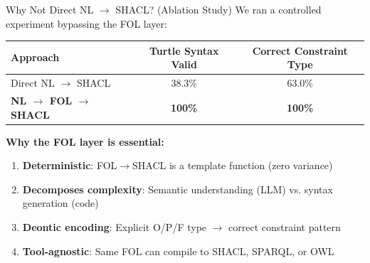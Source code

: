 \documentclass[aspectratio=169, 10pt]{beamer}
\begin{document}
\begin{frame}{Why Not Direct NL $\rightarrow$ SHACL? (Ablation Study)}
    We ran a controlled experiment bypassing the FOL layer:
    
    \vspace{0.2cm}
    \begin{table}[]
        \centering
        \begin{tabular}{lcc}
            \toprule
            \textbf{Approach} & \textbf{Turtle Syntax Valid} & \textbf{Correct Constraint Type} \\
            \midrule
            Direct NL $\rightarrow$ SHACL & 38.3\% & 63.0\% \\
            \textbf{NL $\rightarrow$ FOL $\rightarrow$ SHACL} & \textbf{100\%} & \textbf{100\%} \\
            \bottomrule
        \end{tabular}
    \end{table}
    
    \vspace{0.3cm}
    \textbf{Why the FOL layer is essential:}
    \begin{enumerate}
        \item \textbf{Deterministic}: FOL$\rightarrow$SHACL is a template function (zero variance)
        \item \textbf{Decomposes complexity}: Semantic understanding (LLM) vs. syntax generation (code)
        \item \textbf{Deontic encoding}: Explicit O/P/F type $\rightarrow$ correct constraint pattern
        \item \textbf{Tool-agnostic}: Same FOL can compile to SHACL, SPARQL, or OWL
    \end{enumerate}
\end{frame}
\end{document}
